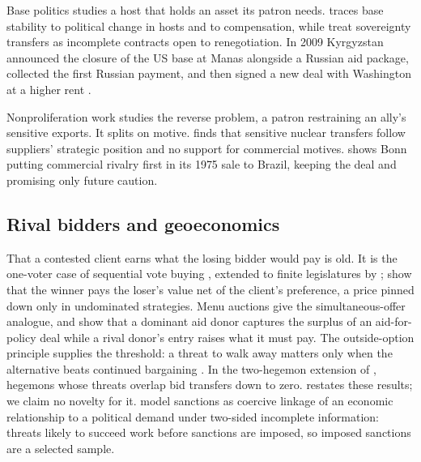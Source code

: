 Base politics studies a host that holds an asset its patron needs. \citet{cooley2008base} traces base stability to political change in hosts and \citet{calder2007embattled} to compensation, while \citet{cooley2009contracting} treat sovereignty transfers as incomplete contracts open to renegotiation. In 2009 Kyrgyzstan announced the closure of the US base at Manas alongside a Russian aid package, collected the first Russian payment, and then signed a new deal with Washington at a higher rent \citep[ch.~7]{cooley2012great}.

Nonproliferation work studies the reverse problem, a patron restraining an ally's sensitive exports. It splits on motive. \citet{kroenig2009exporting} finds that sensitive nuclear transfers follow suppliers' strategic position and no support for commercial motives. \citet{gray2012commercial} shows Bonn putting commercial rivalry first in its 1975 sale to Brazil, keeping the deal and promising only future caution.

\subsection{Rival bidders and geoeconomics}

That a contested client earns what the losing bidder would pay is old. It is the one-voter case of sequential vote buying \citep{groseclose1996buying}, extended to finite legislatures by \citet{banks2000buying}; \citet[Prop.~2]{dekel2008vote} show that the winner pays the loser's value net of the client's preference, a price pinned down only in undominated strategies. Menu auctions \citep{bernheim1986menu, grossman1994protection} give the simultaneous-offer analogue, and \citet{bueno2016competition} show that a dominant aid donor captures the surplus of an aid-for-policy deal while a rival donor's entry raises what it must pay. The outside-option principle supplies the threshold: a threat to walk away matters only when the alternative beats continued bargaining \citep{shaked1984involuntary, sutton1986noncooperative, binmore1989outside}. In the two-hegemon extension of \citet[Supplement B.2]{clayton2026framework}, hegemons whose threats overlap bid transfers down to zero.  restates these results; we claim no novelty for it. \citet{lacy2004theory} model sanctions as coercive linkage of an economic relationship to a political demand under two-sided incomplete information: threats likely to succeed work before sanctions are imposed, so imposed sanctions are a selected sample.

